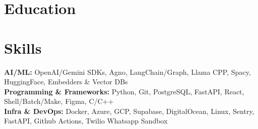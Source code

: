 \documentclass{../templates/simplecv}
\begin{document}
\section{Education}
\resumeItemListStart
{}
\resumeItemListEnd

\vspace{2pt}

\section{Skills}
\vspace{2pt}
\resumeSubHeadingListStart
\small{\item{
\textbf{AI/ML: }{OpenAI/Gemini SDKs, Agno, LangChain/Graph, Llama CPP, Spacy, HuggingFace, Embedders \& Vector DBs} \\ \vspace{1pt}
\textbf{Programming \& Frameworks: }{Python, Git, PostgreSQL, FastAPI, React, Shell/Batch/Make, Figma, C/C++} \\ \vspace{1pt}
\textbf{Infra \& DevOps: }{Docker, Azure, GCP, Supabase, DigitalOcean, Linux, Sentry, FastAPI, Github Actions, Twilio Whatsapp Sandbox} \\ \vspace{1pt}
}}
\resumeSubHeadingListEnd
\end{document}
